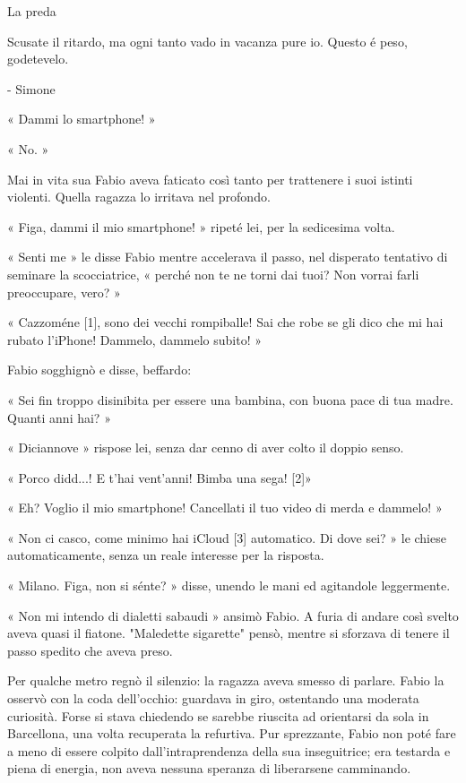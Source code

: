La preda


Scusate il ritardo, ma ogni tanto vado in vacanza pure io. Questo é peso, godetevelo.

- Simone

« Dammi lo smartphone! »

« No. »

Mai in vita sua Fabio aveva faticato così tanto per trattenere i suoi istinti violenti. Quella ragazza lo irritava nel profondo.

« Figa, dammi il mio smartphone! » ripeté lei, per la sedicesima volta.

« Senti me » le disse Fabio mentre accelerava il passo, nel disperato tentativo di seminare la scocciatrice, « perché non te ne torni dai tuoi? Non vorrai farli preoccupare, vero? »

« Cazzoméne [1], sono dei vecchi rompiballe! Sai che robe se gli dico che mi hai rubato l'iPhone! Dammelo, dammelo subito! »

Fabio sogghignò e disse, beffardo:

« Sei fin troppo disinibita per essere una bambina, con buona pace di tua madre. Quanti anni hai? »

« Diciannove » rispose lei, senza dar cenno di aver colto il doppio senso.

« Porco didd...! E t'hai vent'anni! Bimba una sega! [2]»

« Eh? Voglio il mio smartphone! Cancellati il tuo video di merda e dammelo! »

« Non ci casco, come minimo hai iCloud [3] automatico. Di dove sei? » le chiese automaticamente, senza un reale interesse per la risposta.

« Milano. Figa, non si sénte? » disse, unendo le mani ed agitandole leggermente.

« Non mi intendo di dialetti sabaudi » ansimò Fabio. A furia di andare così svelto aveva quasi il fiatone. "Maledette sigarette" pensò, mentre si sforzava di tenere il passo spedito che aveva preso.

Per qualche metro regnò il silenzio: la ragazza aveva smesso di parlare. Fabio la osservò con la coda dell'occhio: guardava in giro, ostentando una moderata curiosità. Forse si stava chiedendo se sarebbe riuscita ad orientarsi da sola in Barcellona, una volta recuperata la refurtiva. Pur sprezzante, Fabio non poté fare a meno di essere colpito dall'intraprendenza della sua inseguitrice; era testarda e piena di energia, non aveva nessuna speranza di liberarsene camminando.

